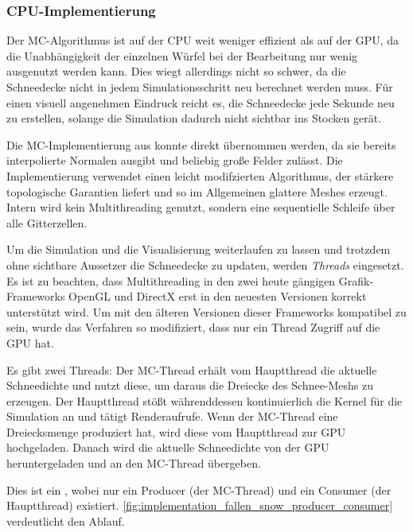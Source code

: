 \subsubsection{CPU-Implementierung}

Der MC-Algorithmus ist auf der CPU weit weniger effizient als auf der
GPU, da die Unabhängigkeit der einzelnen Würfel bei der Bearbeitung
nur wenig ausgenutzt werden kann. Dies wiegt allerdings nicht so
schwer, da die Schneedecke nicht in jedem Simulationsschritt neu
berechnet werden muss. Für einen visuell angenehmen Eindruck reicht
es, die Schneedecke jede Sekunde neu zu erstellen, solange die
Simulation dadurch nicht sichtbar ins Stocken gerät.

Die MC-Implementierung aus \cite{marching_cubes_jgt} konnte direkt
übernommen werden, da sie bereits interpolierte Normalen ausgibt und
beliebig große Felder zulässt. Die Implementierung verwendet einen
leicht modifzierten Algorithmus, der stärkere topologische Garantien
liefert und so im Allgemeinen glattere Meshes erzeugt. Intern wird
kein Multithreading genutzt, sondern eine sequentielle Schleife über
alle Gitterzellen.

Um die Simulation und die Visualisierung weiterlaufen zu lassen und
trotzdem ohne sichtbare Aussetzer die Schneedecke zu updaten, werden
\emph{Threads} eingesetzt. Es ist zu beachten, dass Multithreading in
den zwei heute gängigen Grafik-Frameworks OpenGL und DirectX erst in
den neuesten Versionen korrekt unterstützt wird. Um mit den älteren
Versionen dieser Frameworks kompatibel zu sein, wurde das Verfahren so
modifiziert, dass nur ein Thread Zugriff auf die GPU hat.

Es gibt zwei Threads: Der MC-Thread erhält vom Hauptthread die
aktuelle Schneedichte und nutzt diese, um daraus die Dreiecke des
Schnee-Meshs zu erzeugen. Der Hauptthread stößt währenddessen
kontinuierlich die Kernel für die Simulation an und tätigt
Renderaufrufe. Wenn der MC-Thread eine Dreiecksmenge produziert hat,
wird diese vom Hauptthread zur GPU hochgeladen. Danach wird die
aktuelle Schneedichte von der GPU heruntergeladen und an den MC-Thread
übergeben.

Dies ist ein , wobei nur ein
Producer (der MC-Thread) und ein Consumer (der Hauptthread)
existiert. \autoref{fig:implementation_fallen_snow_producer_consumer} verdeutlicht den Ablauf.

